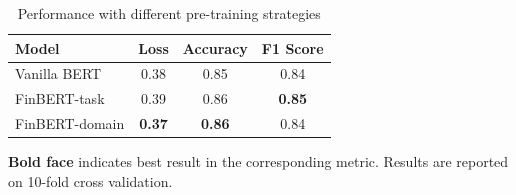 \documentclass[../main.tex]{subfiles}
\begin{document}
\begin{table}
\begin{threeparttable}
  \caption{Performance with different pre-training strategies}
  \label{tab:pretraining}
  \begin{tabular}{lccc}
    \toprule
    Model  & Loss &  Accuracy &  F1 Score\\
    \midrule
    Vanilla BERT &      0.38 & 0.85 & 0.84 \\
    FinBERT-task &      0.39 & 0.86 & \textbf{0.85} \\
    FinBERT-domain   &  \textbf{0.37} & \textbf{0.86} & 0.84 \\
  \bottomrule
\end{tabular}
    \begin{tablenotes}
        \small
        \item \textbf{Bold face} indicates best result in the corresponding metric. Results are reported on 10-fold cross validation.
    \end{tablenotes}

\end{threeparttable}
\end{table}
\end{document}
